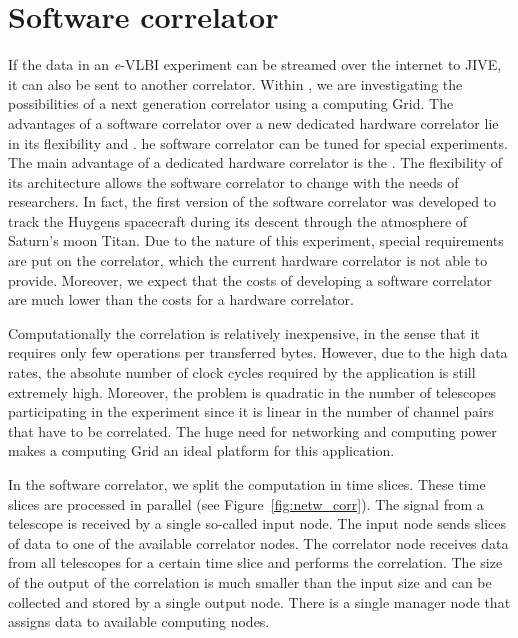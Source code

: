 \section{Software correlator}\label{sec:softwarecorrelation}
If the data in an {\it e}-VLBI experiment can be streamed over the
internet to JIVE, it can also be sent to another correlator. Within
\scarie, we are investigating the possibilities of a next generation
 correlator using a computing Grid. The advantages 
of a software correlator over a new dedicated hardware correlator lie in its
flexibility and . he software correlator can be tuned for
special experiments. The main advantage of a dedicated hardware
correlator is the . 
The flexibility of its architecture allows the software correlator to
change with the needs of researchers. In fact, the first version of
the software correlator was developed to track the Huygens spacecraft
during its descent through the atmosphere of Saturn's moon Titan. Due
to the nature of this experiment, special requirements are put on the
correlator, which the current hardware correlator is not able to
provide.  Moreover, we expect that the costs of developing a software
correlator are much lower than the costs for a hardware correlator.




Computationally the correlation is relatively inexpensive, in the
sense that it requires only few operations per transferred bytes.
However, due to the high data rates, the absolute number of clock
cycles required by the application is still extremely high. Moreover,
the problem is quadratic in the number of telescopes participating in
the experiment since it is linear in the number of channel pairs that
have to be correlated. The huge need for networking and computing
power makes a computing Grid an ideal platform for this application.

In the software correlator, we split the computation in time slices.
These time slices are processed in parallel (see
Figure~\ref{fig:netw_corr}). The signal from a telescope is received
by a single so-called input node.  The input node sends slices of data
to one of the available correlator nodes. The correlator node receives
data from all telescopes for a certain time slice and performs the
correlation. The size of the output of the correlation is much smaller
than the input size and can be collected and stored by a single output
node.  There is a single manager node that assigns data to available
computing nodes.



